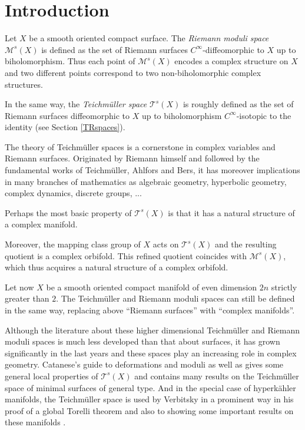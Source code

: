 \documentclass[JEP,XML,SOM,Unicode]{cedram}
\let\mathcal\mathscr
\theoremstyle{plain}
\theoremstyle{definition}
\theoremstyle{remark}
\numberwithin{equation}{section}
\begin{document}
\maketitle
\tableofcontents
\mainmatter

\section{Introduction}
\label{intro}
Let $X$ be a smooth oriented compact surface. The \emph{Riemann moduli space} $\mathcal M^s(X)$ is defined as the set of Riemann surfaces $C^\infty$-diffeomorphic to $X$ up to biholomorphism. Thus each point of $\mathcal M^s(X)$ encodes a complex structure on $X$ and two different points correspond to two non-biholomorphic complex structures.

In the same way, the \emph{Teichmüller space} $\mathcal T^s(X)$ is roughly defined as the set of \hbox{Riemann} surfaces diffeomorphic to $X$ up to biholomorphism $C^\infty$-isotopic to the identity (see Section \ref{TRspaces}).

The theory of Teichmüller spaces is a cornerstone in complex variables and Riemann surfaces. Originated by Riemann himself and followed by the fundamental works of Teichmüller, Ahlfors and Bers, it has moreover implications in many branches of mathematics as algebraic geometry, hyperbolic geometry, complex dynamics, discrete groups, ...

Perhaps the most basic property of $\mathcal T^s(X)$ is that
it has a natural structure of a complex manifold.

Moreover, the mapping class group of $X$ acts on $\mathcal T^s(X)$ and the resulting quotient is a complex orbifold. This refined quotient coincides with $\mathcal M^s(X)$, which thus acquires a natural structure of a complex orbifold.

Let now $X$ be a smooth oriented compact manifold of even dimension $2n$ strictly greater than $2$. The Teichmüller and Riemann moduli spaces can still be defined in the same way, replacing above ``Riemann surfaces'' with ``complex manifolds''.

Although the literature about these higher dimensional Teichmüller and Riemann moduli spaces is much less developed than that about surfaces, it has grown significantly in the last years and these spaces play an increasing role in complex geometry. Catanese's guide to deformations and moduli \cite{Catsurvey} as well as \cite{Catsurvey2} gives some general local properties of $\mathcal T^s(X)$ and contains many results on the Teichmüller space of minimal surfaces of general type. And in the special case of hyperkähler manifolds, the Teichmüller space is used by Verbitsky in a prominent way in his proof of a global Torelli theorem \cite{Verbitsky} and also to showing some important results on these manifolds \cite{VerbitskyErgodic}.
\end{document}
